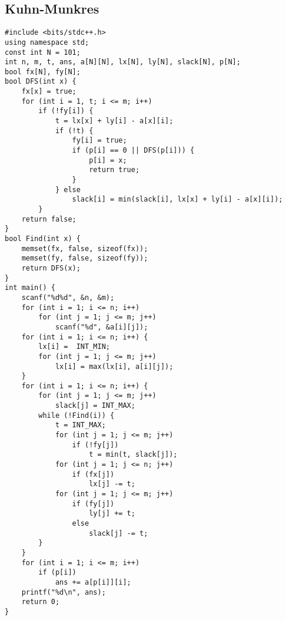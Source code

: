 \documentclass[a4paper]{article}
\begin{document}
\subsection{Kuhn-Munkres}
\begin{lstlisting}
#include <bits/stdc++.h>
using namespace std;
const int N = 101;
int n, m, t, ans, a[N][N], lx[N], ly[N], slack[N], p[N];
bool fx[N], fy[N];
bool DFS(int x) {
    fx[x] = true;
    for (int i = 1, t; i <= m; i++)
        if (!fy[i]) {
            t = lx[x] + ly[i] - a[x][i];
            if (!t) {
                fy[i] = true;
                if (p[i] == 0 || DFS(p[i])) {
                    p[i] = x;
                    return true;
                }
            } else
                slack[i] = min(slack[i], lx[x] + ly[i] - a[x][i]);
        }
    return false;
}
bool Find(int x) {
    memset(fx, false, sizeof(fx));
    memset(fy, false, sizeof(fy));
    return DFS(x);
}
int main() {
    scanf("%d%d", &n, &m);
    for (int i = 1; i <= n; i++)
        for (int j = 1; j <= m; j++)
            scanf("%d", &a[i][j]);
    for (int i = 1; i <= n; i++) {
        lx[i] =  INT_MIN;
        for (int j = 1; j <= m; j++)
            lx[i] = max(lx[i], a[i][j]);
    }
    for (int i = 1; i <= n; i++) {
        for (int j = 1; j <= m; j++)
            slack[j] = INT_MAX;
        while (!Find(i)) {
            t = INT_MAX;
            for (int j = 1; j <= m; j++)
                if (!fy[j])
                    t = min(t, slack[j]);
            for (int j = 1; j <= n; j++)
                if (fx[j])
                    lx[j] -= t;
            for (int j = 1; j <= m; j++)
                if (fy[j])
                    ly[j] += t;
                else
                    slack[j] -= t;
        }
    }
    for (int i = 1; i <= m; i++)
        if (p[i])
            ans += a[p[i]][i];
    printf("%d\n", ans);
    return 0;
}
\end{lstlisting}
\end{document}
